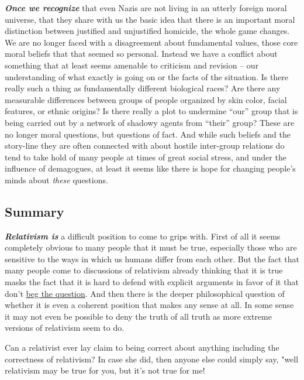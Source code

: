\documentclass[12pt, openany]{book}
\makeatletter
\newenvironment{kframe}{%
\medskip{}
\setlength{\fboxsep}{.8em}
 \def\at@end@of@kframe{}%
 \ifinner\ifhmode%
  \def\at@end@of@kframe{\end{minipage}}%
  \begin{minipage}{\columnwidth}%
 \fi\fi%
 \def\FrameCommand##1{\hskip\@totalleftmargin \hskip-\fboxsep
 \colorbox{shadecolor}{##1}\hskip-\fboxsep
     \hskip-\linewidth \hskip-\@totalleftmargin \hskip\columnwidth}%
 \MakeFramed {\advance\hsize-\width
   \@totalleftmargin\z@ \linewidth\hsize
   \@setminipage}}%
 {\par\unskip\endMakeFramed%
 \at@end@of@kframe}
\newenvironment{rmdblock}[1]
  {
  \begin{itemize}
  \renewcommand{\labelitemi}{
    \raisebox{-.7\height}[0pt][0pt]{
      {\setkeys{Gin}{width=3em,keepaspectratio}\texttt{[image: img/\#1]}}
    }
  }
  \setlength{\fboxsep}{1em}
  \begin{kframe}
  \item
  }
  {
  \end{kframe}
  \end{itemize}
  }
\newenvironment{rmdquestion}
  {\begin{rmdblock}{question}}
  {\end{rmdblock}}
\makeatother
\begin{document}
\textbf{\emph{Once we recognize}} that even Nazis are not living in an utterly foreign moral universe, that they share with us the basic idea that there is an important moral distinction between justified and unjustified homicide, the whole game changes. We are no longer faced with a disagreement about fundamental values, those core moral beliefs that that seemed so personal. Instead we have a conflict about something that at least seems amenable to criticism and revision -- our understanding of what exactly is going on or the facts of the situation. Is there really such a thing as fundamentally different biological races? Are there any measurable differences between groups of people organized by skin color, facial features, or ethnic origins? Is there really a plot to undermine ``our'' group that is being carried out by a network of shadowy agents from ``their'' group? These are no longer moral questions, but questions of fact. And while such beliefs and the story-line they are often connected with about hostile inter-group relations do tend to take hold of many people at times of great social stress, and under the influence of demagogues, at least it seems like there is hope for changing people's minds about \emph{these} questions.

\hypertarget{summary}{%
\subsection*{Summary}\label{summary}}


\textbf{\emph{Relativism is}} a difficult position to come to grips with. First of all it seems completely obvious to many people that it must be true, especially those who are sensitive to the ways in which us humans differ from each other. But the fact that many people come to discussions of relativism already thinking that it is true masks the fact that it is hard to defend with explicit arguments in favor of it that don't \protect\hyperlink{begging-the-question}{beg the question}. And then there is the deeper philosophical question of whether it is even a coherent position that makes any sense at all. In some sense it may not even be possible to deny the truth of all truth as more extreme versions of relativism seem to do.

\begin{rmdquestion}

Can a relativist ever lay claim to being correct about anything including the correctness of relativism? In case she did, then anyone else could simply say, "well relativism may be true for you, but it's not true for me!

\end{rmdquestion}
\end{document}
